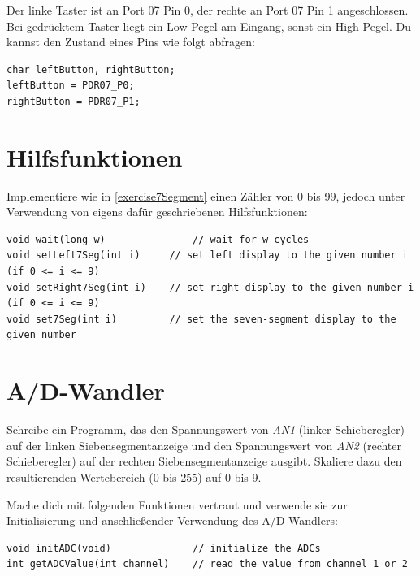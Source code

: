 Der linke Taster ist an Port 07 Pin 0, der rechte an Port 07 Pin 1 angeschlossen.
Bei gedrücktem Taster liegt ein Low-Pegel am Eingang, sonst ein High-Pegel.
Du kannst den Zustand eines Pins wie folgt abfragen:
\begin{lstlisting}
char leftButton, rightButton;
leftButton = PDR07_P0; 
rightButton = PDR07_P1;
\end{lstlisting}




\section{Hilfsfunktionen}
\label{exercise7SegmentUtil}
Implementiere wie in \ref{exercise7Segment} einen Zähler von 0 bis 99, jedoch unter Verwendung von eigens dafür geschriebenen Hilfsfunktionen:
\begin{lstlisting}
void wait(long w)				// wait for w cycles
void setLeft7Seg(int i)		// set left display to the given number i (if 0 <= i <= 9)
void setRight7Seg(int i)	// set right display to the given number i (if 0 <= i <= 9)
void set7Seg(int i)			// set the seven-segment display to the given number
\end{lstlisting}



\section{A/D-Wandler}
Schreibe ein Programm, das den Spannungswert von \emph{AN1} (linker Schieberegler) auf der linken Siebensegmentanzeige und den Spannungswert von \emph{AN2} (rechter Schieberegler) auf der rechten Siebensegmentanzeige ausgibt.
Skaliere dazu den resultierenden Wertebereich (0 bis 255) auf 0 bis 9.

Mache dich mit folgenden Funktionen vertraut und verwende sie zur Initialisierung und anschließender Verwendung des A/D-Wandlers:
\begin{lstlisting}
void initADC(void)				// initialize the ADCs
int getADCValue(int channel)	// read the value from channel 1 or 2
\end{lstlisting}

